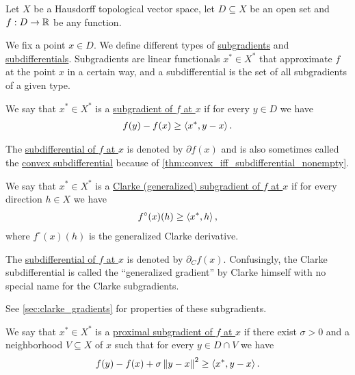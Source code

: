 Let $X$ be a Hausdorff topological vector space, let $D \subseteq X$ be an open set and $f: D \to \mathbb R$ be any function.

\begin{definition}\label{def:subdifferentials}
  We fix a point $x \in D$. We define different types of \uline{subgradients} and \uline{subdifferentials}. Subgradients are linear functionals $x^* \in X^*$ that approximate $f$ at the point $x$ in a certain way, and a subdifferential is the set of all subgradients of a given type.

  \begin{defenum}
    \item\label{def:subdifferentials/convex}\cite[59]{Clarke2013} We say that $x^* \in X^*$ is a \uline{subgradient of $f$ at $x$} if for every $y \in D$ we have
    \begin{align*}
      f(y) - f(x) \geq \left\langle x^*, y - x \right\rangle.
    \end{align*}

    The \uline{subdifferential of $f$ at $x$} is denoted by $\partial f(x)$ and is also sometimes called the \uline{convex subdifferential} because of \cref{thm:convex_iff_subdifferential_nonempty}.

    \item\label{def:subdifferentials/clarke}\cite[definition 10.3]{Clarke2013} We say that $x^* \in X^*$ is a \uline{Clarke (generalized) subgradient of $f$ at $x$} if for every direction $h \in X$ we have
    \begin{align*}
      f^\circ(x)(h) \geq \left\langle x^*, h \right\rangle,
    \end{align*}
    where $f^\circ(x)(h)$ is the generalized Clarke derivative.

    The \uline{subdifferential of $f$ at $x$} is denoted by $\partial_C f(x)$. Confusingly, the Clarke subdifferential is called the \enquote{generalized gradient} by Clarke himself with no special name for the Clarke subgradients.

    See \cref{sec:clarke_gradients} for properties of these subgradients.

    \item\label{def:subdifferentials/proximal}\cite[227]{Clarke2013} We say that $x^* \in X^*$ is a \uline{proximal subgradient of $f$ at $x$} if there exist $\sigma > 0$ and a neighborhood $V \subseteq X$ of $x$ such that for every $y \in D \cap V$ we have
    \begin{align*}
      f(y) - f(x) + \sigma \left\Vert y - x \right\Vert^2 \geq \left\langle x^*, y - x \right\rangle.
    \end{align*}


\end{defenum}
\end{definition}
